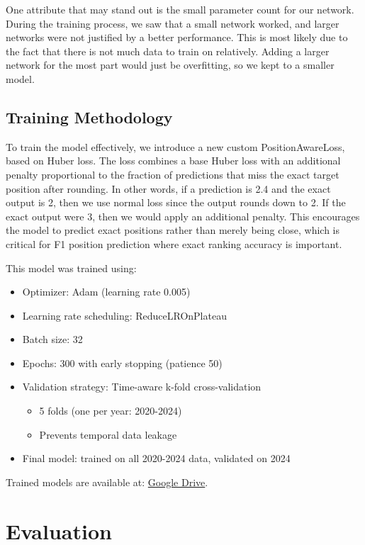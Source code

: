 \documentclass{article}
\begin{document}
One attribute that may stand out is the small parameter count for our network. During the training process, we saw that a small network worked, and larger networks were not justified by a better performance. This is most likely due to the fact that there is not much data to train on relatively. Adding a larger network for the most part would just be overfitting, so we kept to a smaller model.

\subsection{Training Methodology}

To train the model effectively, we introduce a new custom PositionAwareLoss, based on Huber loss. The loss combines a base Huber loss with an additional penalty proportional to the fraction of predictions that miss the exact target position after rounding. In other words, if a prediction is 2.4 and the exact output is 2, then we use normal loss since the output rounds down to 2. If the exact output were 3, then we would apply an additional penalty. This encourages the model to predict exact positions rather than merely being close, which is critical for F1 position prediction where exact ranking accuracy is important.

This model was trained using:
\begin{itemize}
    \item Optimizer: Adam (learning rate 0.005)
    \item Learning rate scheduling: ReduceLROnPlateau
    \item Batch size: 32
    \item Epochs: 300 with early stopping (patience 50)
    \item Validation strategy: Time-aware k-fold cross-validation
    \begin{itemize}
        \item 5 folds (one per year: 2020-2024)
        \item Prevents temporal data leakage
    \end{itemize}
    \item Final model: trained on all 2020-2024 data, validated on 2024
\end{itemize}

Trained models are available at: \href{https://drive.google.com/drive/folders/11P59rYOIyxDgdLGXGs8Tl7WMRHOJ-iar?usp=sharing}{Google Drive}.

\section{Evaluation}
\end{document}
